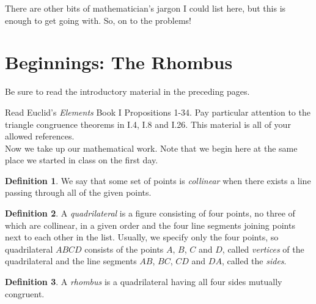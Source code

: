 \documentclass{tufte-handout}
\theoremstyle{definition}
\newtheorem*{definition}{Definition}
\begin{document}
There are other bits of mathematician's jargon I could list here, but this is enough to get going with. So, on to the problems!

\vfill
\pagebreak





\setcounter{section}{1}
\section{Beginnings: The Rhombus}\label{section:rhombi}

Be sure to read the introductory material in the preceding pages.\\


Read Euclid's \emph{Elements} Book I Propositions 1-34. 
Pay particular attention to the triangle congruence theorems in I.4, I.8 and I.26. 
This material is all of your allowed references.\\

Now we take up our mathematical work. Note that we begin here at the same place we started in class on the first day.

\begin{definition}\label{defn:collinear}
We say that some set of points is \emph{collinear} when there exists a line passing through all of the given points.
\end{definition}


\begin{definition}\label{defn:quadrilateral}
A \emph{quadrilateral} is a figure consisting of four points, no three of which are collinear, in a given order and the four line segments joining points next to each other in the list. 
Usually, we specify only the four points, so quadrilateral $ABCD$ consists of the points $A$, $B$, $C$ and $D$, called \emph{vertices} of the quadrilateral and the line segments $AB$, $BC$, $CD$ and $DA$, called the \emph{sides}.
\end{definition}

\begin{definition}\label{defn:rhombus}
A \emph{rhombus} is a quadrilateral having all four sides mutually congruent.
\end{definition}
\end{document}

